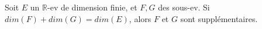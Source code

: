 Soit $E$ un $\mathbb R$-ev de dimension finie, et $F,G$ des sous-ev.  Si $dim(F)+dim(G)=dim(E)$, alors $F$ et $G$ sont supplémentaires.

\begin{reponses}
\end{reponses}


